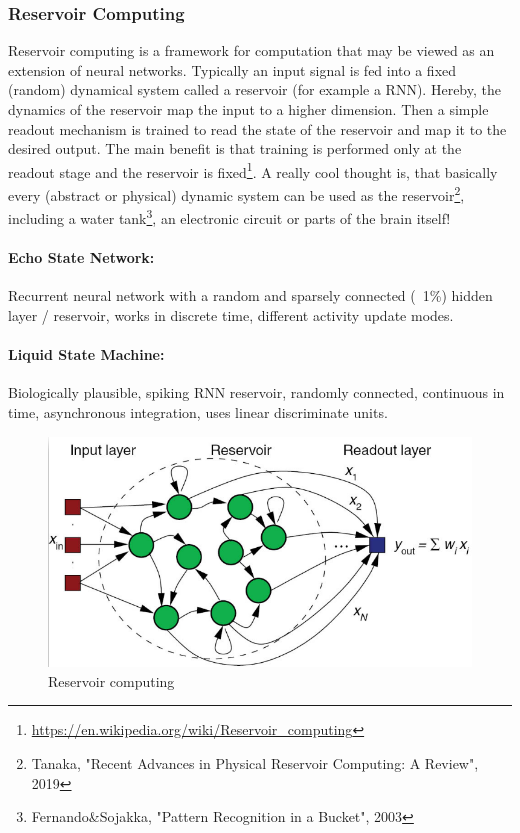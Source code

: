 \documentclass[main]{subfiles}
\begin{document}
\subsubsection{Reservoir Computing}
Reservoir computing is a framework for computation that may be viewed as an extension of neural networks. Typically an input signal is fed into a fixed (random) dynamical system called a reservoir (for example a RNN). Hereby, the dynamics of the reservoir map the input to a higher dimension. Then a simple readout mechanism is trained to read the state of the reservoir and map it to the desired output. The main benefit is that training is performed only at the readout stage and the reservoir is fixed\footnote{\url{https://en.wikipedia.org/wiki/Reservoir_computing}}. A really cool thought is, that basically every (abstract or physical) dynamic system can be used as the reservoir\footnote{Tanaka, "Recent Advances in Physical Reservoir Computing:
A Review", 2019}, including a water tank\footnote{Fernando\&Sojakka, "Pattern Recognition in a Bucket", 2003}, an electronic circuit or parts of the brain itself! 

\paragraph{Echo State Network:} Recurrent neural network with a random and sparsely connected (~1\%) hidden layer / reservoir, works in discrete time, different activity update modes.

\paragraph{Liquid State Machine:} Biologically plausible, spiking RNN reservoir, randomly connected, continuous in time, asynchronous integration, uses linear discriminate units.

\begin{figure}[H]
    \centering
    \includegraphics[width=0.8\linewidth]{13_LearningInRecurrentNeuronalNetworks/figures/reservoir.png}
    \caption{Reservoir computing}
    \label{fig:lstm_many}
\end{figure}
\end{document}

